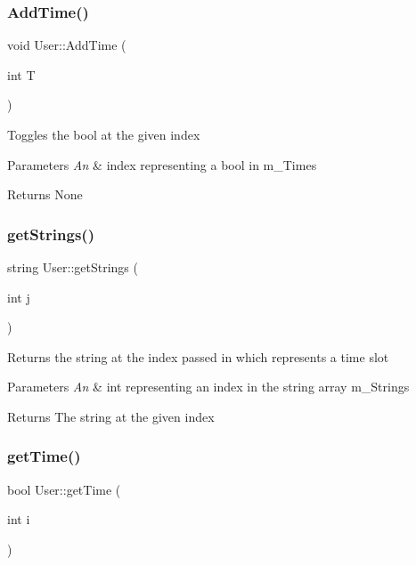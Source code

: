 \subsubsection{\texorpdfstring{Add\+Time()}{AddTime()}}
{\footnotesize\ttfamily void User\+::\+Add\+Time (\begin{DoxyParamCaption}\item[{int}]{T }\end{DoxyParamCaption})}

Toggles the bool at the given index 
\begin{DoxyParams}{Parameters}
{\em An} & index representing a bool in m\+\_\+\+Times \\
\hline
\end{DoxyParams}
\begin{DoxyReturn}{Returns}
None 
\end{DoxyReturn}
\mbox{\label{class_user_a3b0b9cf712efbb632f920a4cc5f18925}} 
\subsubsection{\texorpdfstring{get\+Strings()}{getStrings()}}
{\footnotesize\ttfamily string User\+::get\+Strings (\begin{DoxyParamCaption}\item[{int}]{j }\end{DoxyParamCaption})}

Returns the string at the index passed in which represents a time slot 
\begin{DoxyParams}{Parameters}
{\em An} & int representing an index in the string array m\+\_\+\+Strings \\
\hline
\end{DoxyParams}
\begin{DoxyReturn}{Returns}
The string at the given index 
\end{DoxyReturn}
\mbox{\label{class_user_ab4ba945b0431a19fef9710b16aac4bb5}} 
\subsubsection{\texorpdfstring{get\+Time()}{getTime()}}
{\footnotesize\ttfamily bool User\+::get\+Time (\begin{DoxyParamCaption}\item[{int}]{i }\end{DoxyParamCaption})}

